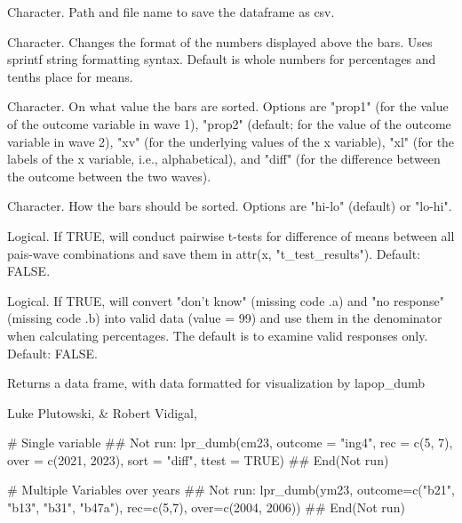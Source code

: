 \documentclass[a4paper]{book}
\begin{document}
\begin{Arguments}
\begin{ldescription}
\item[\code{filesave}] Character.  Path and file name to save the dataframe as csv.

\item[\code{cfmt}] Character. Changes the format of the numbers displayed above the bars.
Uses sprintf string formatting syntax. Default is whole numbers for percentages
and tenths place for means.

\item[\code{sort}] Character. On what value the bars are sorted.
Options are "prop1" (for the value of the outcome variable in wave 1), "prop2"
(default; for the value of the outcome variable in wave 2), "xv" (for
the underlying values of the x variable), "xl" (for the labels of the x variable,
i.e., alphabetical), and "diff" (for the difference between the outcome between
the two waves).

\item[\code{order}] Character.  How the bars should be sorted.  Options are "hi-lo"
(default) or "lo-hi".

\item[\code{ttest}] Logical.  If TRUE, will conduct pairwise t-tests for difference
of means between all pais-wave combinations and save them in attr(x,
"t\_test\_results"). Default: FALSE.

\item[\code{keep\_nr}] Logical.  If TRUE, will convert "don't know" (missing code .a)
and "no response" (missing code .b) into valid data (value = 99) and use them
in the denominator when calculating percentages.  The default is to examine
valid responses only.  Default: FALSE.
\end{ldescription}
\end{Arguments}
%
\begin{Value}
Returns a data frame, with data formatted for visualization by lapop\_dumb
\end{Value}
%
\begin{Author}
Luke Plutowski,  \& Robert Vidigal, 
\end{Author}
%
\begin{Examples}
\begin{ExampleCode}
# Single variable
## Not run: 
lpr_dumb(cm23,
outcome = "ing4",
rec = c(5, 7),
over = c(2021, 2023),
sort = "diff",
ttest = TRUE)
## End(Not run)

# Multiple Variables over years
## Not run: 
lpr_dumb(ym23,
outcome=c("b21", "b13", "b31", "b47a"),
rec=c(5,7),
over=c(2004, 2006))
## End(Not run)
\end{ExampleCode}
\end{Examples}
\end{document}
